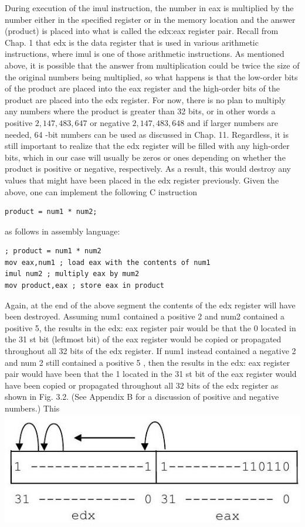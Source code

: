 \documentclass[10pt]{article}
\begin{document}
During execution of the imul instruction, the number in eax is multiplied by the number either in the specified register or in the memory location and the answer (product) is placed into what is called the edx:eax register pair. Recall from Chap. 1 that edx is the data register that is used in various arithmetic instructions, where imul is one of those arithmetic instructions. As mentioned above, it is possible that the answer from multiplication could be twice the size of the original numbers being multiplied, so what happens is that the low-order bits of the product are placed into the eax register and the high-order bits of the product are placed into the edx register. For now, there is no plan to multiply any numbers where the product is greater than 32 bits, or in other words a positive $2,147,483,647$ or negative $2,147,483,648$ and if larger numbers are needed, 64 -bit numbers can be used as discussed in Chap. 11. Regardless, it is still important to realize that the edx register will be filled with any high-order bits, which in our case will usually be zeros or ones depending on whether the product is positive or negative, respectively. As a result, this would destroy any values that might have been placed in the edx register previously. Given the above, one can implement the following C instruction

\begin{verbatim}
product = num1 * num2;
\end{verbatim}

as follows in assembly language:

\begin{verbatim}
; product = num1 * num2
mov eax,num1 ; load eax with the contents of num1
imul num2 ; multiply eax by mum2
mov product,eax ; store eax in product
\end{verbatim}

Again, at the end of the above segment the contents of the edx register will have been destroyed. Assuming num1 contained a positive 2 and num2 contained a positive 5, the results in the edx: eax register pair would be that the 0 located in the 31 st bit (leftmost bit) of the eax register would be copied or propagated throughout all 32 bits of the edx register. If num1 instead contained a negative 2 and num 2 still contained a positive 5 , then the results in the edx: eax register pair would have been that the 1 located in the 31 st bit of the eax register would have been copied or propagated throughout all 32 bits of the edx register as shown in Fig. 3.2. (See Appendix B for a discussion of positive and negative numbers.) This\\
\includegraphics[max width=\textwidth, center]{2025_03_24_ebe50cc223a6fbc49eecg-049}
\end{document}
